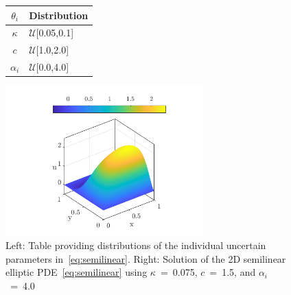 \begin{figure}[htbp]
\begin{center}
\begin{minipage}[htbp]{.25\linewidth}
\vspace{0pt}
\hspace{-25mm}
\begin{tabular}{cl}
\toprule
$\theta_i$ & \textbf{Distribution} \\ 
\bottomrule
$\kappa$ & $\mathcal{U}$[0.05,0.1] \\
$c$ & $\mathcal{U}$[1.0,2.0] \\
$\alpha_i$ & $\mathcal{U}$[0.0,4.0] \\
\bottomrule
\end{tabular}
\end{minipage}
\hspace{-20mm}
\begin{minipage}[htbp]{.25\linewidth}
\vspace{0pt}
\includegraphics[width=3.0in]{./Figures/u_soln.png}
\end{minipage}%
\end{center} 
\caption{Left: Table providing distributions of the individual
uncertain parameters in~\eqref{eq:semilinear}. Right: Solution
of the 2D semilinear elliptic PDE~\eqref{eq:semilinear} using
$\kappa$~=~0.075, $c$~=~1.5, and $\alpha_i$~=~4.0}
\label{fig:elliptic}
\end{figure}

